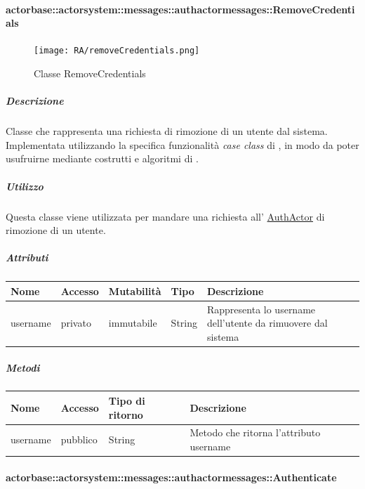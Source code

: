 \documentclass{scalatekids-article}
\begin{document}
\paragraph{actorbase::actorsystem::messages::authactormessages::RemoveCredentials}
\label{sec:actorbase::actorsystem::messages::authactormessages::RemoveCredentials}

\begin{figure}[H]
  \begin{center}
    \texttt{[image: RA/removeCredentials.png]}
    \caption{Classe RemoveCredentials}
  \end{center}
\end{figure}

\subparagraph{Descrizione}
Classe che rappresenta una richiesta di rimozione di un utente dal
sistema.\\Implementata utilizzando la specifica funzionalità \textit{case class}
di , in modo da poter usufruirne mediante costrutti e algoritmi di
.

\subparagraph{Utilizzo}
Questa classe viene utilizzata per mandare una richiesta all'
\hyperref[sec:actorbase::actorsystem::actors::authactor::AuthActor]{AuthActor}
di rimozione di un utente.

\subparagraph{Attributi}
\begin{tabular}{| p{2cm} | p{1.5cm} | p{2cm} | p{3cm} | p{8.5cm} |}
  \hline
  Nome & Accesso & Mutabilità & Tipo & Descrizione\\
  \hline
  username & privato & immutabile & String & Rappresenta lo username dell'utente da rimuovere dal sistema\\
  \hline
\end{tabular}

\subparagraph{Metodi}
\begin{tabular}{| p{3cm} | p{1.5cm} | p{3.5cm} | p{9cm} |}
  \hline
  Nome & Accesso & Tipo di ritorno & Descrizione\\
  \hline
  username & pubblico & String & Metodo che ritorna l'attributo username\\
  \hline
\end{tabular}

\paragraph{actorbase::actorsystem::messages::authactormessages::Authenticate}
\label{sec:actorbase::actorsystem::messages::authactormessages::Authenticate}
\end{document}
